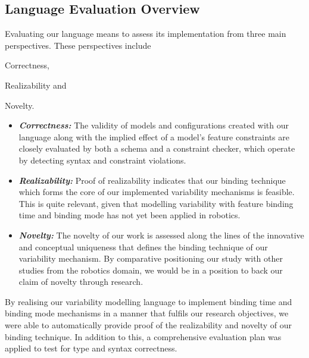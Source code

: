 \documentclass[conference]{IEEEtran}
\begin{document}
\subsection{Language Evaluation Overview}
Evaluating our language means to assess its implementation from three main perspectives. These perspectives include \begin{enumerate*}[label=(\roman*)]
\item Correctness,
\item Realizability and
\item Novelty.
\end{enumerate*}
\begin{itemize}
    \item \textit{\textbf{Correctness:}} The validity of models and configurations created with our language along with the implied effect of a model's feature constraints are closely evaluated by both a schema and a constraint checker, which operate by detecting syntax and constraint violations.
    
    \item \textit{\textbf{Realizability:}} Proof of realizability indicates that our binding technique which forms the core of our implemented variability mechanisms is feasible. This is quite relevant, given that modelling variability with feature binding time and binding mode has not yet been applied in robotics.
    
    \item \textit{\textbf{Novelty:}} The novelty of our work is assessed along the lines of the innovative and conceptual uniqueness that defines the binding technique of our variability mechanism. By comparative positioning our study with other studies from the robotics domain, we would be in a position to back our claim of novelty through research.
\end{itemize}

By realising our variability modelling language to implement binding time and binding mode mechanisms in a manner that fulfils our research objectives, we were able to automatically provide proof of the realizability and novelty of our binding technique. In addition to this, a comprehensive evaluation plan was applied to test for type and syntax correctness.
\end{document}
